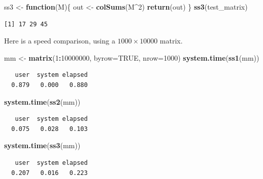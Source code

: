 \documentclass[
]{krantz}
\makeatletter
\newenvironment{Shaded}{\begin{snugshade}}{\end{snugshade}}
\newcommand{\ControlFlowTok}[1]{\textcolor[rgb]{0.27,0.27,0.27}{\textbf{#1}}}
\newcommand{\DataTypeTok}[1]{\textcolor[rgb]{0.27,0.27,0.27}{#1}}
\newcommand{\DecValTok}[1]{\textcolor[rgb]{0.06,0.06,0.06}{#1}}
\newcommand{\KeywordTok}[1]{\textcolor[rgb]{0.27,0.27,0.27}{\textbf{#1}}}
\newcommand{\NormalTok}[1]{#1}
\newcommand{\OperatorTok}[1]{\textcolor[rgb]{0.43,0.43,0.43}{\textbf{#1}}}
\newcommand{\OtherTok}[1]{\textcolor[rgb]{0.37,0.37,0.37}{#1}}
\newcommand{\StringTok}[1]{\textcolor[rgb]{0.5,0.5,0.5}{#1}}
\newenvironment{kframe}{%
\medskip{}
\setlength{\fboxsep}{.8em}
 \def\at@end@of@kframe{}%
 \ifinner\ifhmode%
  \def\at@end@of@kframe{\end{minipage}}%
  \begin{minipage}{\columnwidth}%
 \fi\fi%
 \def\FrameCommand##1{\hskip\@totalleftmargin \hskip-\fboxsep
 \colorbox{shadecolor}{##1}\hskip-\fboxsep
     \hskip-\linewidth \hskip-\@totalleftmargin \hskip\columnwidth}%
 \MakeFramed {\advance\hsize-\width
   \@totalleftmargin\z@ \linewidth\hsize
   \@setminipage}}%
 {\par\unskip\endMakeFramed%
 \at@end@of@kframe}
\renewenvironment{Shaded}{\begin{kframe}}{\end{kframe}}
\makeatother
\begin{document}
\begin{Shaded}
\begin{Highlighting}[]
\NormalTok{ss3 \textless{}{-}}\StringTok{ }\ControlFlowTok{function}\NormalTok{(M)\{}
\NormalTok{    out \textless{}{-}}\StringTok{ }\KeywordTok{colSums}\NormalTok{(M}\OperatorTok{\^{}}\DecValTok{2}\NormalTok{)}
    \KeywordTok{return}\NormalTok{(out)}
\NormalTok{\}}
\KeywordTok{ss3}\NormalTok{(test\_matrix)}
\end{Highlighting}
\end{Shaded}

\begin{verbatim}
[1] 17 29 45
\end{verbatim}

Here is a speed comparison, using a \(1000\times 10000\) matrix.

\begin{Shaded}
\begin{Highlighting}[]
\NormalTok{mm \textless{}{-}}\StringTok{ }\KeywordTok{matrix}\NormalTok{(}\DecValTok{1}\OperatorTok{:}\DecValTok{10000000}\NormalTok{, }\DataTypeTok{byrow=}\OtherTok{TRUE}\NormalTok{, }\DataTypeTok{nrow=}\DecValTok{1000}\NormalTok{)}
\KeywordTok{system.time}\NormalTok{(}\KeywordTok{ss1}\NormalTok{(mm))}
\end{Highlighting}
\end{Shaded}

\begin{verbatim}
   user  system elapsed 
  0.879   0.000   0.880 
\end{verbatim}

\begin{Shaded}
\begin{Highlighting}[]
\KeywordTok{system.time}\NormalTok{(}\KeywordTok{ss2}\NormalTok{(mm))}
\end{Highlighting}
\end{Shaded}

\begin{verbatim}
   user  system elapsed 
  0.075   0.028   0.103 
\end{verbatim}

\begin{Shaded}
\begin{Highlighting}[]
\KeywordTok{system.time}\NormalTok{(}\KeywordTok{ss3}\NormalTok{(mm))}
\end{Highlighting}
\end{Shaded}

\begin{verbatim}
   user  system elapsed 
  0.207   0.016   0.223 
\end{verbatim}
\end{document}
